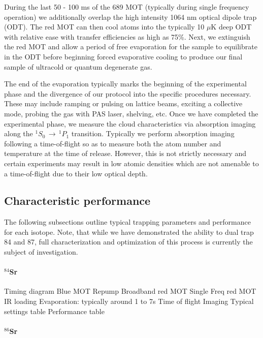 During the last 50 - 100 ms of the 689 MOT (typically during single frequency operation) we additionally overlap the high intensity 1064 nm optical dipole trap (ODT).
The red MOT can then cool atoms into the typically 10 $\mu$K deep ODT with relative ease with transfer efficiencies as high as 75\%. 
Next, we extinguish the red MOT and allow a period of free evaporation for the sample to equilibrate in the ODT before beginning forced evaporative cooling to produce our final sample of ultracold or quantum degenerate gas.

The end of the evaporation typically marks the beginning of the experimental phase and the divergence of our protocol into the specific procedures necessary. 
These may include ramping or pulsing on lattice beams, exciting a collective mode, probing the gas with PAS laser, shelving, etc. 
Once we have completed the experimental phase, we measure the cloud characteristics via absorption imaging along the $^1S_0\,\rightarrow\,^1P_1$ transition. 
Typically we perform absorption imaging following a time-of-flight so as to measure both the atom number and temperature at the time of release. 
However, this is not strictly necessary and certain experiments may result in low atomic densities which are not amenable to a time-of-flight due to their low optical depth.

\subsection{Characteristic performance} \label{sec:benchmark_trapping}

The following subsections outline typical trapping parameters and performance for each isotope. Note, that while we have demonstrated the ability to dual trap 84 and 87, full characterization and optimization of this process is currently the subject of investigation.

\paragraph{$^{84}$Sr} \label{sec:84_trapping}

Timing diagram
	Blue MOT
	Repump
	Broadband red MOT
	Single Freq red MOT
	IR loading
	Evaporation: typically around 1 to 7s
	Time of flight
	Imaging
Typical settings table
Performance table

\paragraph{$^{86}$Sr} \label{sec:86_trapping}


